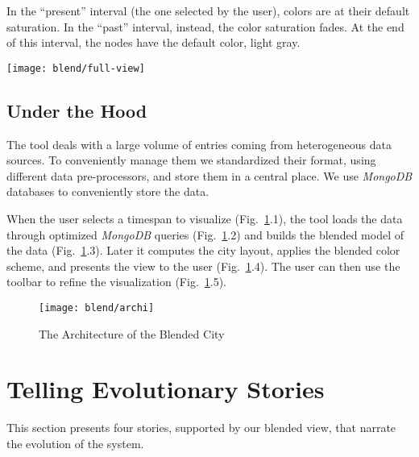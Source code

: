 In the ``present'' interval (\ie the one selected by the user), colors are at their default saturation. In the ``past''  interval, instead, the color saturation fades. At the end of this interval, the nodes have the default color, \ie light gray.



\begin{figure*}[ht]
\centering
\texttt{[image: blend/full-view]}
\caption{View of the City With All the Activities}
\label{fig:full-view}
\end{figure*}

\subsection{Under the Hood}

The tool deals with a large volume of entries coming from heterogeneous data sources. To conveniently manage them we standardized their format, using different data pre-processors, and store them in a central place. We use \textit{MongoDB} databases to conveniently store the data. 

When the user selects a timespan to visualize (Fig.~\ref{fig:archi}.1), the tool loads the data through optimized \textit{MongoDB} queries  (Fig.~\ref{fig:archi}.2) and builds the blended model of the data  (Fig.~\ref{fig:archi}.3). Later it computes the city layout, applies the blended color scheme, and presents the view to the user (Fig.~\ref{fig:archi}.4). The user can then use the toolbar to refine the visualization (Fig.~\ref{fig:archi}.5).

\begin{figure}[h!]
\centering
\texttt{[image: blend/archi]}
\caption{The Architecture of the Blended City}
\label{fig:archi}
\end{figure}



\section{Telling Evolutionary Stories}\label{sec:stories}

This section presents four stories, supported by our blended view, that narrate the evolution of the \pha system.

